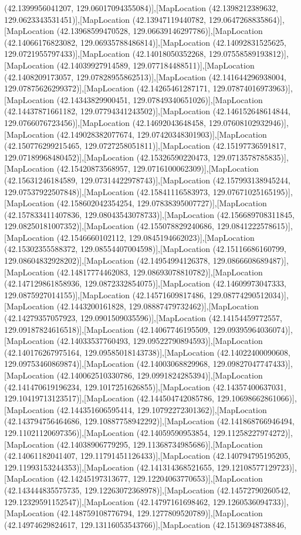 (42.1399956041207, 129.06017094355084)],[MapLocation (42.1398212389632, 129.0623343531451)],[MapLocation (42.13947119440782, 129.0647268835864)],[MapLocation (42.13968599470528, 129.06639146297786)],[MapLocation (42.14066176823082, 129.06935788486814)],[MapLocation (42.14092831525625, 129.0721955797433)],[MapLocation (42.14018050352268, 129.07558589193812)],[MapLocation (42.14039927914589, 129.077184488511)],[MapLocation (42.1408209173057, 129.07828955862513)],[MapLocation (42.141644296938004, 129.07875626299372)],[MapLocation (42.14265461287171, 129.07874016973963)],[MapLocation (42.14343829900451, 129.07849340651026)],[MapLocation (42.14437871661182, 129.07794341243502)],[MapLocation (42.146152648614844, 129.0766076723456)],[MapLocation (42.14692043648458, 129.07608102932946)],[MapLocation (42.149028382077674, 129.07420348301903)],[MapLocation (42.150776299215465, 129.0727258051811)],[MapLocation (42.15197736591817, 129.07189968480452)],[MapLocation (42.15326590220473, 129.0713578785835)],[MapLocation (42.15420873568957, 129.0716100062309)],[MapLocation (42.15631246184589, 129.07314422978743)],[MapLocation (42.157993138945244, 129.07537922507848)],[MapLocation (42.15841116583973, 129.07671025165195)],[MapLocation (42.158602042354254, 129.07838395007727)],[MapLocation (42.157833411407836, 129.08043543078733)],[MapLocation (42.156689708311845, 129.08250181007352)],[MapLocation (42.155078829240686, 129.0841222578615)],[MapLocation (42.1546660102112, 129.0845194662023)],[MapLocation (42.15302355588372, 129.08554407004598)],[MapLocation (42.15116686160799, 129.08604832928202)],[MapLocation (42.14954994126378, 129.0866608689487)],[MapLocation (42.14817774462083, 129.08693078810782)],[MapLocation (42.147129861858936, 129.0872332854075)],[MapLocation (42.14609973047333, 129.0875927014155)],[MapLocation (42.14571609817486, 129.08774290512034)],[MapLocation (42.1443200161828, 129.08887479732462)],[MapLocation (42.14279357057923, 129.0901509035596)],[MapLocation (42.14154459772557, 129.09187824616518)],[MapLocation (42.14067746195509, 129.09395964036074)],[MapLocation (42.14033537760493, 129.09522790894593)],[MapLocation (42.140176267975164, 129.09585018143738)],[MapLocation (42.14022400090608, 129.09753460869874)],[MapLocation (42.14003068829968, 129.09827047747433)],[MapLocation (42.140062510330786, 129.0991824285394)],[MapLocation (42.141470619196234, 129.1017251626855)],[MapLocation (42.14357400637031, 129.10419713123517)],[MapLocation (42.144504742085786, 129.10698662861066)],[MapLocation (42.144351606595414, 129.10792272301362)],[MapLocation (42.143794756464686, 129.10887758942292)],[MapLocation (42.141868766946494, 129.11021120697356)],[MapLocation (42.14059590953854, 129.11258227974272)],[MapLocation (42.14038906779295, 129.11368734985686)],[MapLocation (42.14061182041407, 129.11791451126433)],[MapLocation (42.140794795195205, 129.11993153244353)],[MapLocation (42.141314368521655, 129.12108577129723)],[MapLocation (42.14245197313677, 129.12204063770653)],[MapLocation (42.143444835575735, 129.12263072368978)],[MapLocation (42.14572790260542, 129.12329591152547)],[MapLocation (42.14797161698462, 129.1260536094733)],[MapLocation (42.148759108776794, 129.1277809520789)],[MapLocation (42.14974629824617, 129.13116053543766)],[MapLocation (42.15136948738846, 